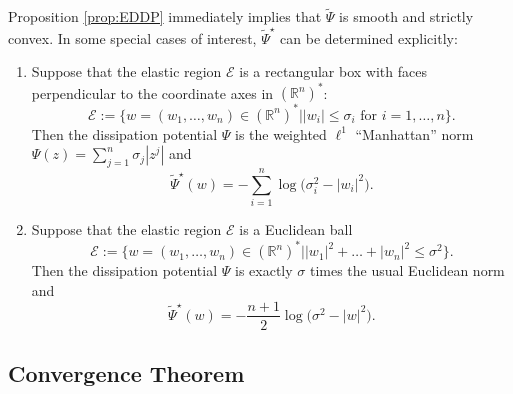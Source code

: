 \documentclass[reqno]{amsart}
\theoremstyle{definition}
\begin{document}
Proposition \ref{prop:EDDP} immediately implies that ${\widetilde{\Psi}}$ is smooth and strictly convex.  In some special cases of interest, ${\widetilde{\Psi}}^{\star}$ can be determined explicitly:
\begin{enumerate}
	\item Suppose that the elastic region ${\mathcal{E}}$ is a rectangular box with faces perpendicular to the coordinate axes in $({\mathbb{R}}^{n})^{\ast}$:
	\begin{equation}
		\label{eq:elas_Manhattan}
		{\mathcal{E}} := \big\{ w = (w_{1}, \ldots, w_{n}) \in ({\mathbb{R}}^{n})^{\ast} \big| | w_{i} | \leq \sigma_{i} \text{ for } i = 1, \ldots, n \big\}.
	\end{equation}
	Then the dissipation potential $\Psi$ is the weighted $\ell^{1}$ ``Manhattan'' norm $\Psi(z) = \sum_{j = 1}^{n} \sigma_{j} | z^{j} |$ and
	\begin{equation}
		\label{eq:EDDP_Manhattan}
		{\widetilde{\Psi}}^{\star} (w) = - \sum_{i = 1}^{n} \log \big( \sigma_{i}^{2} - | w_{i} |^{2} \big).
	\end{equation}
	\item Suppose that the elastic region ${\mathcal{E}}$ is a Euclidean ball
	\begin{equation}
		\label{eq:elas_Euclidean}
		{\mathcal{E}} := \big\{ w = (w_{1}, \ldots, w_{n}) \in ({\mathbb{R}}^{n})^{\ast} \big| | w_{1} |^{2} + \dots + | w_{n} |^{2} \leq \sigma^{2} \big\}.
	\end{equation}
	Then the dissipation potential $\Psi$ is exactly $\sigma$ times the usual Euclidean norm and
	\begin{equation}
		\label{eq:EDDP_Euclidean}
		{\widetilde{\Psi}}^{\star} (w) = - \frac{n + 1}{2} \log \big( \sigma^{2} - | w |^{2} \big).
	\end{equation}
\end{enumerate}

\subsection{Convergence Theorem}
\end{document}
